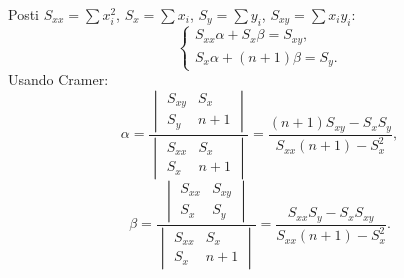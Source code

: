 \documentclass[11pt,a4paper]{article}
\begin{document}
Posti $S_{xx}=\sum x_i^2$, $S_x=\sum x_i$, $S_y=\sum y_i$, $S_{xy}=\sum x_iy_i$:
\[\begin{cases}S_{xx}\alpha+S_x\beta=S_{xy},\\S_x\alpha+(n+1)\beta=S_y.\end{cases}\]
Usando Cramer:
\[\alpha=\frac{\begin{vmatrix}S_{xy}&S_x\\S_y&n+1\end{vmatrix}}{\begin{vmatrix}S_{xx}&S_x\\S_x&n+1\end{vmatrix}}=\frac{(n+1)S_{xy}-S_xS_y}{S_{xx}(n+1)-S_x^2},\]
\[\beta=\frac{\begin{vmatrix}S_{xx}&S_{xy}\\S_x&S_y\end{vmatrix}}{\begin{vmatrix}S_{xx}&S_x\\S_x&n+1\end{vmatrix}}=\frac{S_{xx}S_y-S_xS_{xy}}{S_{xx}(n+1)-S_x^2}.\]


\end{document}
